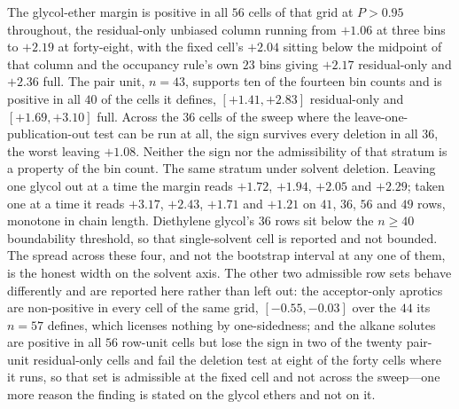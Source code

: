 The glycol-ether margin is positive in all $56$ cells of that grid at $P>0.95$ throughout, the
residual-only unbiased column running from $+1.06$ at three bins to $+2.19$ at forty-eight, with the
fixed cell's $+2.04$ sitting below the midpoint of that column and the occupancy rule's own
$23$ bins giving $+2.17$ residual-only and $+2.36$ full. The pair unit, $n{=}43$, supports ten of the fourteen bin counts and is
positive in all $40$ of the cells it defines, $[+1.41,+2.83]$ residual-only and $[+1.69,+3.10]$
full. Across the $36$ cells of the sweep where the leave-one-publication-out test can be run at
all, the sign survives every deletion in all $36$, the worst leaving $+1.08$. Neither the sign nor
the admissibility of that stratum is a property of the bin count.
The same stratum under solvent deletion. Leaving one glycol out at a time the margin reads
$+1.72$, $+1.94$, $+2.05$ and $+2.29$; taken one at a time it reads $+3.17$, $+2.43$, $+1.71$ and
$+1.21$ on $41$, $36$, $56$ and $49$ rows, monotone in chain length. Diethylene glycol's $36$ rows
sit below the $n\ge40$ boundability threshold, so that single-solvent cell is reported and not
bounded. The spread across these four, and not the bootstrap interval at any one of them, is the
honest width on the solvent axis. The other two admissible row sets
behave differently and are reported here rather than left out: the acceptor-only aprotics are
non-positive in every cell of the same grid, $[-0.55,-0.03]$ over the $44$ its $n{=}57$ defines,
which licenses nothing by one-sidedness; and the alkane solutes are positive in all $56$ row-unit
cells but lose the sign in two of the twenty pair-unit residual-only cells and fail the deletion test at
eight of the forty cells where it runs, so that set is admissible at the fixed cell and not across
the sweep---one more reason the finding is stated on the glycol ethers and not on it.

